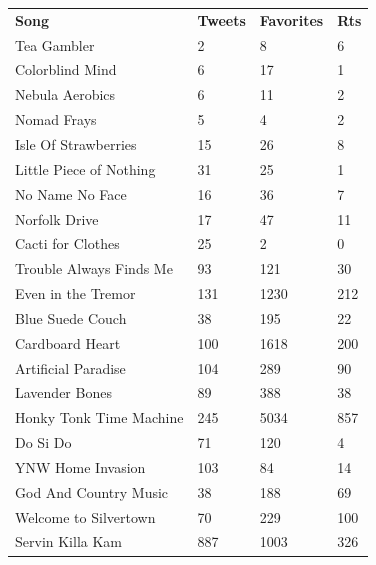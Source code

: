 \documentclass[12pt,conference]{IEEEtran}
\begin{document}
\begin{center}
\begin{small}
{\begin{tabular}{l|l|l|l}
\centering 
\textbf{Song} & \textbf{Tweets} & \textbf{Favorites} & \textbf{Rts}      \\
Tea Gambler                     & 2      & 8         & 6        \\
Colorblind Mind                 & 6      & 17        & 1        \\
Nebula Aerobics                 & 6      & 11        & 2        \\
Nomad Frays                     & 5      & 4         & 2        \\
Isle Of Strawberries            & 15     & 26        & 8        \\
Little Piece of Nothing         & 31     & 25        & 1        \\
No Name No Face                 & 16     & 36        & 7        \\
Norfolk Drive                   & 17     & 47        & 11       \\
Cacti for Clothes               & 25     & 2         & 0        \\
Trouble Always Finds Me         & 93     & 121       & 30       \\
Even in the Tremor              & 131    & 1230      & 212      \\
Blue Suede Couch                & 38     & 195       & 22       \\
Cardboard Heart                 & 100    & 1618      & 200      \\
Artificial Paradise             & 104    & 289       & 90       \\
Lavender Bones                  & 89     & 388       & 38       \\
Honky Tonk Time Machine         & 245    & 5034      & 857      \\
Do Si Do                        & 71     & 120       & 4        \\
YNW Home Invasion               & 103    & 84        & 14       \\
God And Country Music           & 38     & 188       & 69       \\
Welcome to Silvertown           & 70     & 229       & 100      \\
Servin Killa Kam                & 887    & 1003      & 326      \\

\end{tabular}}
\end{small}
\end{center}
\end{document}
